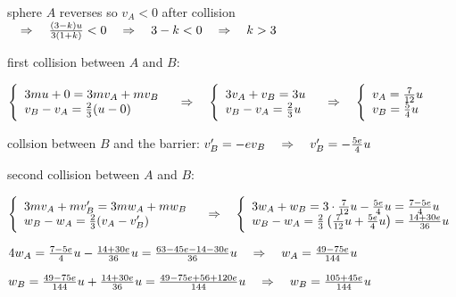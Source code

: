 sphere $A$ reverses so $v_A<0$ after collision $\quad \Rightarrow \quad \frac{(3-k)u}{3(1+k)}<0 \quad \Rightarrow \quad 3-k <0 \quad \Rightarrow \quad k>3$ \eoe


first collision between $A$ and $B$:

{
	
	\centering
	
	$\Bigg\{\begin{array}{l}
	3mu + 0 = 3m v_A + m v_B \\
	v_B - v_A = \frac{2}{3}(u-0)
	\end{array} \quad \Rightarrow \quad
	\Bigg\{\begin{array}{l}
	3v_A + v_B = 3u\\
	v_B - v_A = \frac{2}{3}u
	\end{array} \quad \Rightarrow \quad 
	\Bigg\{\begin{array}{l}
	v_A = \frac{7}{12}u \\
	v_B = \frac{5}{4}u
	\end{array}$
	
}

collsion between $B$ and the barrier: $v_B' = -ev_B \quad \Rightarrow \quad v_B' = -\frac{5e}{4}u$

second collision between $A$ and $B$:

{
	
	\centering
	
	$\Bigg\{\begin{array}{l}
	3mv_A + mv_B' = 3m w_A + m w_B \\
	w_B - w_A = \frac{2}{3}(v_A-v_B')
	\end{array} \quad \Rightarrow \quad
	\Bigg\{\begin{array}{l}
	3w_A + w_B = 3\cdot\frac{7}{12}u - \frac{5e}{4}u = \frac{7-5e}{4}u\\
	w_B - w_A = \frac{2}{3} \left(\frac{7}{12}u + \frac{5e}{4}u\right) = \frac{14+30e}{36}u
	\end{array}	$
	
	\vspace*{0.1\baselineskip}
	
	$4w_A = \frac{7-5e}{4}u-\frac{14+30e}{36}u = \frac{63-45e-14-30e}{36}u \quad \Rightarrow \quad w_A = \frac{49-75e}{144}u$
	
	\vspace*{0.1\baselineskip}
	
	$w_B = \frac{49-75e}{144}u + \frac{14+30e}{36}u = \frac{49-75e + 56 + 120e}{144}u \quad \Rightarrow \quad w_B = \frac{105+45e}{144}u $

}

